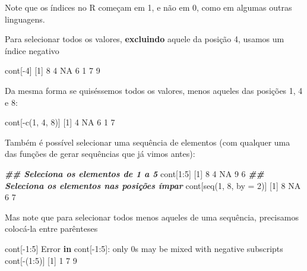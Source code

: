 \documentclass[
  10pt,
  a4paper]{book}
\newenvironment{Shaded}{\begin{snugshade}}{\end{snugshade}}
\newcommand{\AttributeTok}[1]{\textcolor[rgb]{0.77,0.63,0.00}{#1}}
\newcommand{\ConstantTok}[1]{\textcolor[rgb]{0.00,0.00,0.00}{#1}}
\newcommand{\ControlFlowTok}[1]{\textcolor[rgb]{0.13,0.29,0.53}{\textbf{#1}}}
\newcommand{\DecValTok}[1]{\textcolor[rgb]{0.00,0.00,0.81}{#1}}
\newcommand{\DocumentationTok}[1]{\textcolor[rgb]{0.56,0.35,0.01}{\textbf{\textit{#1}}}}
\newcommand{\FunctionTok}[1]{\textcolor[rgb]{0.00,0.00,0.00}{#1}}
\newcommand{\NormalTok}[1]{#1}
\newcommand{\SpecialCharTok}[1]{\textcolor[rgb]{0.00,0.00,0.00}{#1}}
\newcommand{\StringTok}[1]{\textcolor[rgb]{0.31,0.60,0.02}{#1}}
\begin{document}
Note que os índices no R começam em 1, e não em 0, como em algumas outras
linguagens.

Para selecionar todos os valores, \textbf{excluindo} aquele da posição 4,
usamos um índice negativo

\begin{Shaded}
\begin{Highlighting}[]
\NormalTok{cont[}\SpecialCharTok{{-}}\DecValTok{4}\NormalTok{]}
\NormalTok{[}\DecValTok{1}\NormalTok{]  }\DecValTok{8}  \DecValTok{4} \ConstantTok{NA}  \DecValTok{6}  \DecValTok{1}  \DecValTok{7}  \DecValTok{9}
\end{Highlighting}
\end{Shaded}

Da mesma forma se quiséssemos todos os valores, menos aqueles das
posições 1, 4 e 8:

\begin{Shaded}
\begin{Highlighting}[]
\NormalTok{cont[}\SpecialCharTok{{-}}\FunctionTok{c}\NormalTok{(}\DecValTok{1}\NormalTok{, }\DecValTok{4}\NormalTok{, }\DecValTok{8}\NormalTok{)]}
\NormalTok{[}\DecValTok{1}\NormalTok{]  }\DecValTok{4} \ConstantTok{NA}  \DecValTok{6}  \DecValTok{1}  \DecValTok{7}
\end{Highlighting}
\end{Shaded}

Também é possível selecionar uma sequência de elementos (com qualquer
uma das funções de gerar sequências que já vimos antes):

\begin{Shaded}
\begin{Highlighting}[]
\DocumentationTok{\#\# Seleciona os elementos de 1 a 5}
\NormalTok{cont[}\DecValTok{1}\SpecialCharTok{:}\DecValTok{5}\NormalTok{]}
\NormalTok{[}\DecValTok{1}\NormalTok{]  }\DecValTok{8}  \DecValTok{4} \ConstantTok{NA}  \DecValTok{9}  \DecValTok{6}
\DocumentationTok{\#\# Seleciona os elementos nas posições ímpar}
\NormalTok{cont[}\FunctionTok{seq}\NormalTok{(}\DecValTok{1}\NormalTok{, }\DecValTok{8}\NormalTok{, }\AttributeTok{by =} \DecValTok{2}\NormalTok{)]}
\NormalTok{[}\DecValTok{1}\NormalTok{]  }\DecValTok{8} \ConstantTok{NA}  \DecValTok{6}  \DecValTok{7}
\end{Highlighting}
\end{Shaded}

Mas note que para selecionar todos menos aqueles de uma sequência,
precisamos colocá-la entre parênteses

\begin{Shaded}
\begin{Highlighting}[]
\NormalTok{cont[}\SpecialCharTok{{-}}\DecValTok{1}\SpecialCharTok{:}\DecValTok{5}\NormalTok{]}
\NormalTok{Error }\ControlFlowTok{in}\NormalTok{ cont[}\SpecialCharTok{{-}}\DecValTok{1}\SpecialCharTok{:}\DecValTok{5}\NormalTok{]}\SpecialCharTok{:}\NormalTok{ only }\DecValTok{0}\StringTok{\textquotesingle{}s may be mixed with negative subscripts}
\StringTok{cont[{-}(1:5)]}
\StringTok{[1] 1 7 9}
\end{Highlighting}
\end{Shaded}
\end{document}
